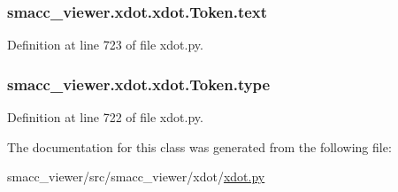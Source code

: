 \subsubsection[{\texorpdfstring{text}{text}}]{\setlength{\rightskip}{0pt plus 5cm}smacc\+\_\+viewer.\+xdot.\+xdot.\+Token.\+text}\hypertarget{classsmacc__viewer_1_1xdot_1_1xdot_1_1Token_af765dfd251590406846bad3ea9b6312f}{}\label{classsmacc__viewer_1_1xdot_1_1xdot_1_1Token_af765dfd251590406846bad3ea9b6312f}


Definition at line 723 of file xdot.\+py.

\subsubsection[{\texorpdfstring{type}{type}}]{\setlength{\rightskip}{0pt plus 5cm}smacc\+\_\+viewer.\+xdot.\+xdot.\+Token.\+type}\hypertarget{classsmacc__viewer_1_1xdot_1_1xdot_1_1Token_af1f0de5000e29708ef7f0ca9b39cb0d9}{}\label{classsmacc__viewer_1_1xdot_1_1xdot_1_1Token_af1f0de5000e29708ef7f0ca9b39cb0d9}


Definition at line 722 of file xdot.\+py.



The documentation for this class was generated from the following file\+:\begin{DoxyCompactItemize}
\item 
smacc\+\_\+viewer/src/smacc\+\_\+viewer/xdot/\hyperlink{xdot_8py}{xdot.\+py}\end{DoxyCompactItemize}
